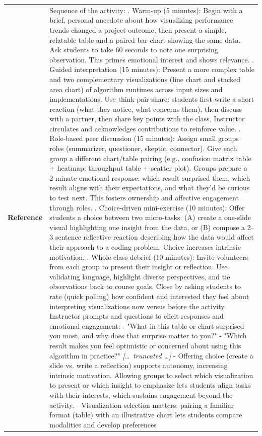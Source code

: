 \begin{longtable}{@{}l p{13cm}@{}}
  \textbf{Reference} & Sequence of the activity: \newline 1. Warm-up (5 minutes): Begin with a brief, personal anecdote about how visualizing performance trends changed a project outcome, then present a simple, relatable table and a paired bar chart showing the same data. Ask students to take 60 seconds to note one surprising observation. This primes emotional interest and shows relevance. \newline 2. Guided interpretation (15 minutes): Present a more complex table and two complementary visualizations (line chart and stacked area chart) of algorithm runtimes across input sizes and implementations. Use think-pair-share: students first write a short reaction (what they notice, what concerns them), then discuss with a partner, then share key points with the class. Instructor circulates and acknowledges contributions to reinforce value. \newline 3. Role-based peer discussion (15 minutes): Assign small groups roles (summarizer, questioner, skeptic, connector). Give each group a different chart/table pairing (e.g., confusion matrix table + heatmap; throughput table + scatter plot). Groups prepare a 2-minute emotional response: which result surprised them, which result aligns with their expectations, and what they'd be curious to test next. This fosters ownership and affective engagement through roles. \newline 4. Choice-driven mini-exercise (10 minutes): Offer students a choice between two micro-tasks: (A) create a one-slide visual highlighting one insight from the data, or (B) compose a 2--3 sentence reflective reaction describing how the data would affect their approach to a coding problem. Choice increases intrinsic motivation. \newline 5. Whole-class debrief (10 minutes): Invite volunteers from each group to present their insight or reflection. Use validating language, highlight diverse perspectives, and tie observations back to course goals. Close by asking students to rate (quick polling) how confident and interested they feel about interpreting visualizations now versus before the activity. \newline Instructor prompts and questions to elicit responses and emotional engagement: \newline - "What in this table or chart surprised you most, and why does that surprise matter to you?" \newline - "Which result makes you feel optimistic or concerned about using this algorithm in practice?" \newline \textit{[\ldots\ truncated \ldots]} \newline - Offering choice (create a slide vs. write a reflection) supports autonomy, increasing intrinsic motivation. Allowing groups to select which visualization to present or which insight to emphasize lets students align tasks with their interests, which sustains engagement beyond the activity. \newline - Visualization selection matters: pairing a familiar format (table) with an illustrative chart lets students compare modalities and develop preferences 
\end{longtable}
